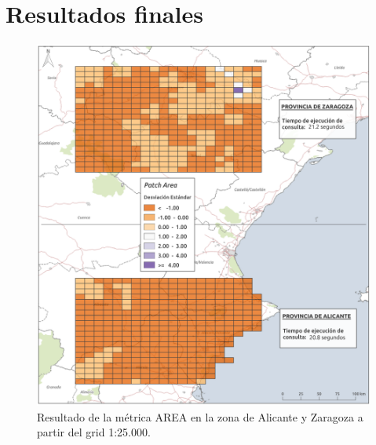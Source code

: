 \chapter{Resultados finales}\label{anex:results}

\begin{figure}
\begin{center}
\includegraphics[width=\textwidth]{ResultadosyDiscusion/Figs/Results/p_25.png}
\caption{Resultado de la métrica AREA en la zona de Alicante y Zaragoza a partir del grid 1:25.000.}
\end{center}
\end{figure}

